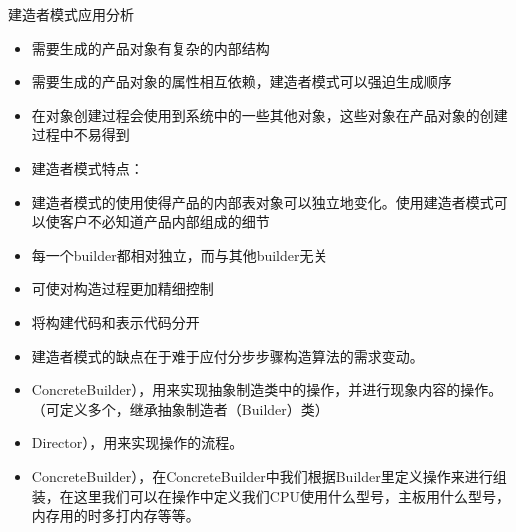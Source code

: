 \documentclass[9pt, b5paper]{article}
\begin{document}
建造者模式应用分析
\begin{itemize}
\item 需要生成的产品对象有复杂的内部结构
\item 需要生成的产品对象的属性相互依赖，建造者模式可以强迫生成顺序
\item 在对象创建过程会使用到系统中的一些其他对象，这些对象在产品对象的创建过程中不易得到
\item 建造者模式特点：
\item 建造者模式的使用使得产品的内部表对象可以独立地变化。使用建造者模式可以使客户不必知道产品内部组成的细节
\item 每一个builder都相对独立，而与其他builder无关
\item 可使对构造过程更加精细控制
\item 将构建代码和表示代码分开
\item 建造者模式的缺点在于难于应付分步步骤构造算法的需求变动。
\item ConcreteBuilder），用来实现抽象制造类中的操作，并进行现象内容的操作。（可定义多个，继承抽象制造者（Builder）类）
\item Director），用来实现操作的流程。
\item ConcreteBuilder），在ConcreteBuilder中我们根据Builder里定义操作来进行组装，在这里我们可以在操作中定义我们CPU使用什么型号，主板用什么型号，内存用的时多打内存等等。
\end{itemize}
\end{document}
